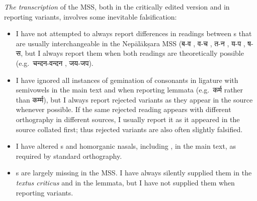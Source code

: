 \noindent
\textit{The transcription} of the MSS, both in the critically edited version and
in reporting variants, involves some inevitable falsification:

\begin{itemize}

\item I have not attempted to always report differences in readings between s that are usually
        interchangeable in the Nepālākṣara MSS ({\devanagarifont ब-व} , {\devanagarifont  व-च} , {\devanagarifont त-न} ,  
                {\devanagarifont य-प} , {\devanagarifont ष-स},
                but I always report them when both readings are
                theoretically possible (e.g.\ {\devanagarifont चन्दन}-{\devanagarifont वन्दन} , {\devanagarifont जय-जप}).


\item I have ignored all instances of gemination of consonants in ligature with semivowels in the main text 
and when reporting lemmata (e.g.\ {\devanagarifont कर्म} rather than {\devanagarifont कर्म्म}), 
but I always report rejected variants as they appear in the source whenever possible. If the same rejected reading
appears with different orthography in different sources, I usually report it as it appeared in the source collated first;
thus rejected variants are also often slightly falsified.


\item I have altered s and homorganic nasals, including , in the main text, as
       required by standard orthography.

\item {}s are largely missing in the MSS. I have always silently supplied them
        in the \textit{textus criticus} and in the lemmata, but I have not supplied them when reporting variants.


\end{itemize}
